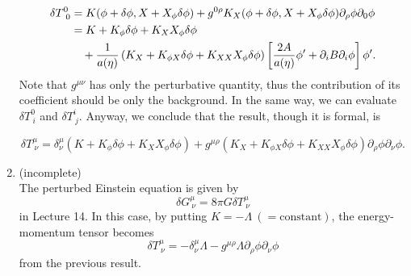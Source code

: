 \documentclass[a4paper,pdftex,10pt]{article}
\begin{document}
\begin{enumerate}
\begin{align}
          \delta T^{0}_{\ 0}
          &=
          K(\phi+\delta\phi,X+X_{\phi}\delta\phi)
          +
          g^{0\rho}
          K_{X}(\phi+\delta\phi,X+X_{\phi}\delta\phi)
          \partial_{\rho}\phi\partial_{0}\phi   
          \nonumber
          \\
          &=      
          K+K_{\phi}\delta\phi+K_{X}X_{\phi}\delta\phi
          \nonumber
          \\
          &
          \hspace*{10pt}
          +
          \frac{1}{a(\eta)}
          \left(  
            K_{X}+K_{\phi X}\delta\phi+K_{XX}X_{\phi}\delta\phi              
          \right)
          \left[  
            \frac{2A}{a(\eta)}\phi^{\prime}
            +
            \partial_{i}B\partial_{i}\phi
          \right]
          \phi^{\prime}
          .
        \end{align}
        Note that $g^{\mu\nu}$ has only the perturbative quantity, thus the contribution of its coefficient should be only the background. In the same way, we can evaluate $\delta T^{0}_{\ i}$ and $\delta T^{i}_{\ j}$. Anyway, we conclude that the result, though it is formal, is 
        \begin{graybox}
          \begin{equation}
            \delta T^{\mu}_{\ \nu}
            =
            \delta^{\mu}_{\nu}\left( K+K_{\phi}\delta\phi+K_{X}X_{\phi}\delta\phi \right)
            +
            g^{\mu\rho}
            \left(  
              K_{X}+K_{\phi X}\delta\phi+K_{XX}X_{\phi}\delta\phi              
            \right)
            \partial_{\rho}\phi\partial_{\nu}\phi
            .
          \end{equation}
        \end{graybox}

  \item
        (incomplete)\\
        The perturbed Einstein equation is given by
        \begin{equation}
          \delta G^{\mu}_{\ \nu}
          =
          8\pi G\delta T^{\mu}_{\ \nu}
        \end{equation}
        in Lecture 14. In this case, by putting $K=-\Lambda\ (=\textrm{constant})$, the energy-momentum tensor becomes
        \begin{equation}
          \delta T^{\mu}_{\ \nu}
          =
          -
          \delta^{\mu}_{\nu}\Lambda
          -
          g^{\mu\rho}
          \Lambda
          \partial_{\rho}\phi\partial_{\nu}\phi          
        \end{equation}
        from the previous result. 








\end{enumerate}
\end{document}
